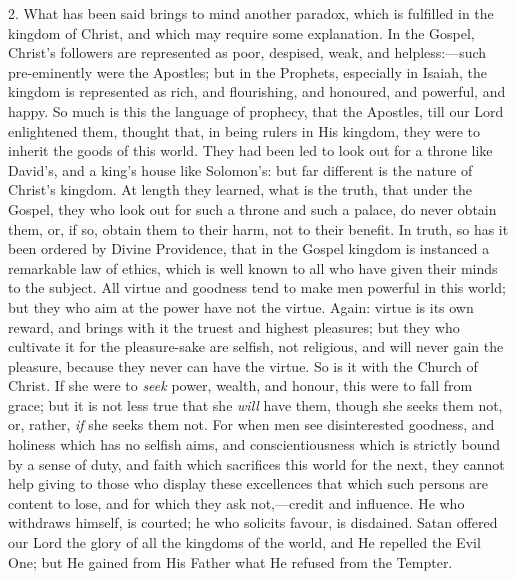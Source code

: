 2. What has been said brings to mind another paradox, which is
fulfilled in the kingdom of Christ, and which may require some
explanation. In the Gospel, Christ's followers are represented as
poor, despised, weak, and helpless:—such pre-eminently were the
Apostles; but in the Prophets, especially in Isaiah, the kingdom is
represented as rich, and flourishing, and honoured, and powerful, and
happy. So much is this the language of prophecy, that the Apostles,
till our Lord enlightened them, thought that, in being rulers in His
kingdom, they were to inherit the goods of this world. They had been
led to look out for a throne like David's, and a king's house like
Solomon's: but far different is the nature of Christ's kingdom. At
length they learned, what is the truth, that under the Gospel, they
who look out for such a throne and such a palace, do never obtain
them, or, if so, obtain them to their harm, not to their benefit. In
truth, so has it been ordered by Divine Providence, that in the Gospel
kingdom is instanced a remarkable law of ethics, which is well known
to all who have given their minds to the subject. All virtue and
goodness tend to make men powerful in this world; but they who aim at
the power have not the virtue. Again: virtue is its own reward, and
brings with it the truest and highest pleasures; but they who
cultivate it for the pleasure-sake are selfish, not religious, and
will never gain the pleasure, because they never can have the virtue.
So is it with the Church of Christ. If she were to \emph{seek} power, wealth,
and honour, this were to fall from grace; but it is not less true that
she \emph{will} have them, though she seeks them not, or, rather, \emph{if}
she seeks them not. For when men see disinterested goodness, and
holiness which has no selfish aims, and conscientiousness which is
strictly bound by a sense of duty, and faith which sacrifices this
world for the next, they cannot help giving to those who display these
excellences that which such persons are content to lose, and for which
they ask not,—credit and influence. He who withdraws himself, is
courted; he who solicits favour, is disdained. Satan offered our Lord
the glory of all the kingdoms of the world, and He repelled the Evil
One; but He gained from His Father what He refused from the Tempter.

